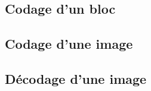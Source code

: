 \documentclass[a4paper, 12pt]{article}
\newcommand{\FSource}[1]{%

}
\begin{document}
\FSource{../QuantM.m}

\newpage

\subsection{Codage d'un bloc}\label{codage_code}

\FSource{../code.m}

\newpage

\subsection{Codage d'une image}\label{codage_image_code}

\FSource{../codJPG.m}

\newpage

\subsection{Décodage d'une image}\label{decodage_image_code}

\FSource{../decJPG.m}

\newpage
\end{document}
